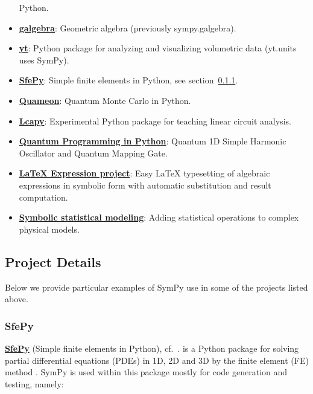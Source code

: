 \begin{itemize}
  Python.
\item
  \href{https://github.com/brombo/galgebra}{\textbf{galgebra}}:
  Geometric algebra (previously sympy.galgebra).
\item
  \href{http://yt-project.org/}{\textbf{yt}}: Python package for
  analyzing and visualizing volumetric data (yt.units uses SymPy).
\item
  \href{http://sfepy.org/}{\textbf{SfePy}}: Simple finite elements in
  Python, see section~\ref{sfepy}.
\item
  \href{http://quameon.sourceforge.net/}{\textbf{Quameon}}: Quantum
  Monte Carlo in Python.
\item
  \href{http://lcapy.elec.canterbury.ac.nz/}{\textbf{Lcapy}}:
  Experimental Python package for teaching linear circuit analysis.
\item
  \href{http://digitalcommons.calpoly.edu/cgi/viewcontent.cgi?article=1072\&context=physsp/}{\textbf{Quantum
  Programming in Python}}: Quantum 1D Simple Harmonic Oscillator and
  Quantum Mapping Gate.
\item
  \href{http://mech.fsv.cvut.cz/~stransky/software/latexexpr/doc/}{\textbf{LaTeX
  Expression project}}: Easy LaTeX typesetting of algebraic expressions
  in symbolic form with automatic substitution and result computation.
\item
  \href{https://www.researchgate.net/publication/260585491_Symbolic_Statistics_with_SymPy/}{\textbf{Symbolic
  statistical modeling}}: Adding statistical operations to complex
  physical models.
\end{itemize}

\subsection{Project Details}\label{projects-details}

Below we provide particular examples of SymPy use in some of the projects
listed above.

\subsubsection{SfePy}\label{sfepy}

\href{http://sfepy.org/}{\textbf{SfePy}} (Simple finite elements in Python),
cf.~\cite{cimrman2014sfepy}. is a Python package for solving partial
differential equations (PDEs) in 1D, 2D and 3D by the finite element (FE)
method \cite{Zienkiewicz2013FEM}. SymPy is used within this package mostly for
code generation and testing, namely:

